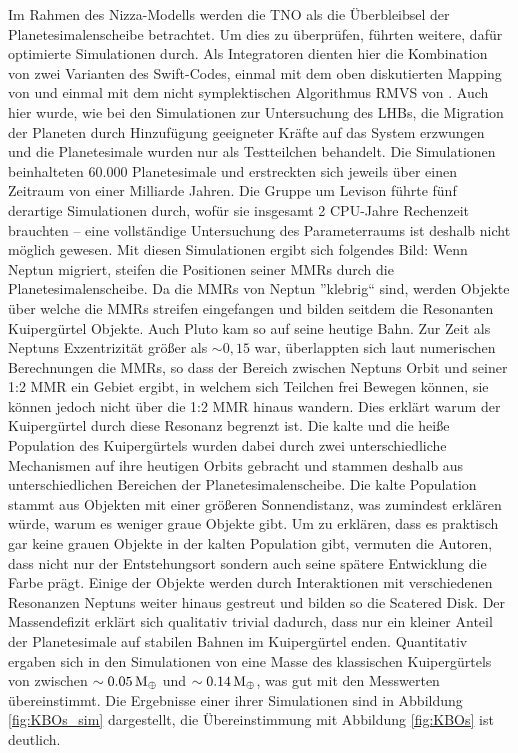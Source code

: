 \documentclass[12pt,a4paper,twoside]{article}
\renewcommand{\cite}{\citep}
\newcommand{\ME}{M_\oplus}
\begin{document}
\noindent
Im Rahmen des Nizza-Modells werden die TNO als die Überbleibsel der Planetesimalenscheibe betrachtet.
Um dies zu überprüfen, führten \cite{Levison2008} weitere, dafür optimierte Simulationen durch. Als Integratoren  dienten hier die Kombination von zwei Varianten des Swift-Codes, einmal mit dem oben diskutierten Mapping von \cite{Wisdom1991} und einmal mit dem nicht symplektischen Algorithmus RMVS von \cite{Levison1994}. Auch hier wurde, wie bei den Simulationen zur Untersuchung des LHBs, die Migration der Planeten durch Hinzufügung geeigneter Kräfte auf das System erzwungen und die Planetesimale wurden nur als Testteilchen behandelt\cite{Levison2008}.
Die Simulationen beinhalteten 60.000 Planetesimale und erstreckten sich jeweils über einen Zeitraum von einer Milliarde Jahren\cite{Levison2008}. Die Gruppe um Levison führte fünf derartige Simulationen durch, wofür sie insgesamt 2 CPU-Jahre Rechenzeit brauchten – eine vollständige Untersuchung des Parameterraums ist deshalb nicht möglich gewesen\cite{Levison2008}.
Mit diesen Simulationen ergibt sich folgendes Bild:
Wenn Neptun migriert, steifen die Positionen seiner MMRs durch die Planetesimalenscheibe. Da die MMRs von Neptun ''klebrig`` sind\cite{Levison2008}, werden Objekte über welche die MMRs streifen eingefangen und bilden seitdem die Resonanten Kuipergürtel Objekte. Auch Pluto kam so auf seine heutige Bahn.
Zur Zeit als Neptuns Exzentrizität größer als $\sim 0,15$ war, überlappten sich laut numerischen Berechnungen die MMRs, so dass der Bereich zwischen Neptuns Orbit und seiner 1:2 MMR ein Gebiet ergibt, in welchem sich Teilchen frei Bewegen können, sie können jedoch nicht über die 1:2 MMR hinaus wandern\cite{Levison2008}. Dies erklärt warum der Kuipergürtel durch diese Resonanz begrenzt ist.
Die kalte und die heiße Population des Kuipergürtels wurden dabei durch zwei unterschiedliche Mechanismen auf ihre heutigen Orbits gebracht und stammen deshalb aus unterschiedlichen Bereichen der Planetesimalenscheibe. Die kalte Population stammt aus Objekten mit einer größeren Sonnendistanz, was zumindest erklären würde, warum es weniger graue Objekte gibt. Um zu erklären, dass es praktisch gar keine grauen Objekte in der kalten Population gibt, vermuten die Autoren, dass nicht nur der Entstehungsort sondern auch seine spätere Entwicklung die Farbe prägt\cite{Levison2008}.
Einige der Objekte werden durch Interaktionen mit verschiedenen Resonanzen Neptuns weiter hinaus gestreut und bilden so die Scatered Disk\cite{Levison2008}.
Der Massendefizit erklärt sich qualitativ trivial dadurch, dass nur ein kleiner Anteil der Planetesimale auf stabilen Bahnen im Kuipergürtel enden. Quantitativ ergaben sich in den Simulationen von \cite{Levison2008} eine Masse des klassischen Kuipergürtels von zwischen $\sim\unit[0.05]{\ME}$ und $\sim\unit[0.14]{\ME}$, was gut mit den Messwerten übereinstimmt.
Die Ergebnisse einer ihrer Simulationen sind in Abbildung \ref{fig:KBOs_sim} dargestellt, die Übereinstimmung mit Abbildung \ref{fig:KBOs} ist deutlich.
\end{document}
